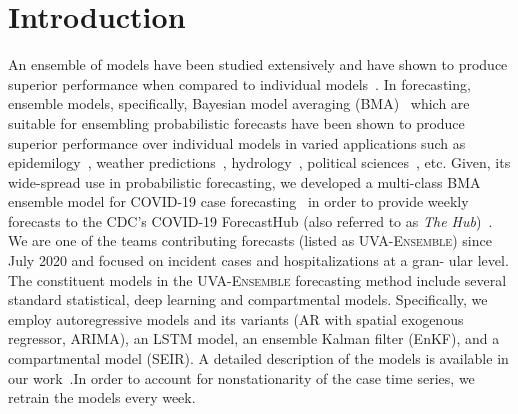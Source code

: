 \documentclass[conference,compsoc]{IEEEtran}
\newcommand{\hub}{\emph{The Hub}}
\begin{document}
\section{Introduction}
An ensemble of models have been studied extensively and have shown to produce superior performance when compared to individual models~\cite{sagi2018ensemble}. In forecasting, ensemble models, specifically, Bayesian model averaging (BMA)~\cite{raftery2005using} which are suitable for ensembling probabilistic forecasts have been shown to produce superior performance over individual models in varied applications such as  epidemilogy~\cite{yamana2016superensemble,reich2019collaborative,cramer2022evaluation}, weather predictions~\cite{raftery2005using}, hydrology~\cite{duan2007multi}, political sciences~\cite{montgomery2012improving}, etc. Given, its wide-spread use in probabilistic forecasting, we developed a multi-class BMA ensemble model for COVID-19 case forecasting~\cite{allmodels} in order to provide weekly forecasts to the CDC's COVID-19 ForecastHub (also referred to as \hub{})~\cite{Cramer2021-hub-dataset}. We are one of
the teams contributing forecasts (listed as \textsc{UVA-Ensemble}) since July 2020 and focused on incident cases and hospitalizations at a gran-
ular level. The constituent models in the \textsc{UVA-Ensemble} forecasting method include several standard statistical, deep learning and compartmental models. Specifically, we employ autoregressive models and its variants (AR with spatial exogenous regressor, ARIMA), an LSTM model, an ensemble Kalman filter (EnKF), and a compartmental model (SEIR). A detailed description of the models is available in our work~\cite{allmodels}.In order to account for nonstationarity of the case time series, we retrain the models every week.  
\end{document}
